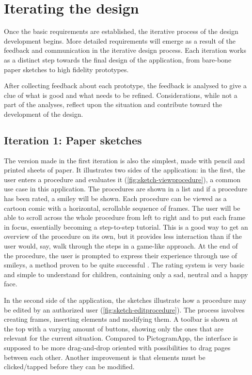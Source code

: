 \chapter{Iterating the design}
\label{ch:iterating}

Once the basic requirements are established, the iterative process of the design development begins. More detailed requirements will emerge as a result of the feedback and communication in the iterative design process. Each iteration works as a distinct step towards the final design of the application, from bare-bone paper sketches to high fidelity prototypes.

After collecting feedback about each prototype, the feedback is analysed to give a clue of what is good and what needs to be refined. Considerations, while not a part of the analyses, reflect upon the situation and contribute toward the development of the design.

\section{Iteration 1: Paper sketches}
\label{sec:iteration1}

The version made in the first iteration is also the simplest, made with pencil and printed sheets of paper. It illustrates two sides of the application: in the first, the user enters a procedure and evaluates it (\autoref{fig:sketch-viewprocedure}), a common use case in this application. The procedures are shown in a list and if a procedure has been rated, a smiley will be shown. Each procedure can be viewed as a cartoon comic with a horizontal, scrollable sequence of frames. The user will be able to scroll across the whole procedure from left to right and to put each frame in focus, essentially becoming a step-to-step tutorial. This is a good way to get an overview of the procedure on its own, but it provides less interaction than if the user would, say, walk through the steps in a game-like approach. At the end of the procedure, the user is prompted to express their experience through use of smileys, a method proven to be quite successful \parencite{stalberg2016}. The rating system is very basic and simple to understand for children, containing only a sad, neutral and a happy face.

In the second side of the application, the sketches illustrate how a procedure may be edited by an authorized user (\autoref{fig:sketch-editprocedure}). The process involves creating frames, inserting elements and modifying them. A toolbar is shown at the top with a varying amount of buttons, showing only the ones that are relevant for the current situation. Compared to PictogramApp, the interface is supposed to be more drag-and-drop oriented with possibilities to drag pages between each other. Another improvement is that elements must be clicked/tapped before they can be modified.

